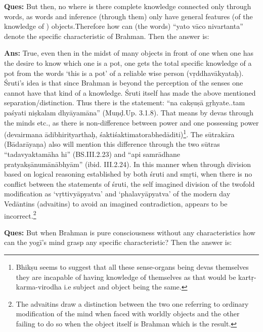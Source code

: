 
\textbf{Ques:}  But then, no where is there complete knowledge connected only through words, as words and inference (through them) only have general features (of the knowledge of ) objects.Therefore how can (the words) “yato vāco nivartanta” denote the specific characteristic of Brahman. Then the answer is: 

\textbf{Ans:} True, even then in the midst of many objects in front of one when one has the desire to know which one is a pot, one gets the total specific knowledge of a pot from the words ‘this is a pot’ of a reliable wise person (vṛddhavākyataḥ). Śruti’s idea is that since Brahman is beyond the perception of the senses one cannot have that kind of a knowledge. Śruti itself has made the above mentioned separation/distinction. Thus there is the statement:  “na cakṣuṣā gṛhyate..tam paśyati niṣkalam dhyāyamāna” (Muṇḍ.Up. 3.1.8). That means by devas through the minds etc., as there is non-difference between power and one possessing power (devairmana ādibhirityarthaḥ, śaktiśaktimatorabhedāditi)\footnote{Bhikṣu seems to suggest that all these sense-organs being devas themselves they are incapable of having knowledge of themselves as that would be kartṛ-karma-virodha i.e subject and object being the same.}. The sūtrakāra (Bādarāyaṇa) also will mention this difference through the two sūtras “tadavyaktamāha hi” (BS.III.2.23) and “api samrādhane pratyakṣānumānābhyām” (ibid. III.2.24). In this manner when through division based on logical reasoning established by both śruti and smṛti, when there is no conflict between the statements of śruti, the self imagined division of the twofold modification as ‘vṛttivyāpyatva’ and ‘phalavyāpyatva’ of the modern day Vedāntins (advaitins) to avoid an imagined contradiction, appears to be incorrect.\footnote{The advaitins draw a distinction between the two one referring to ordinary modification of the mind when faced with worldly objects and the other failing to do so when the object itself is Brahman which is the result.}

\textbf{Ques:}  But when Brahman is pure consciousness without any characteristics how can the yogī’s mind grasp any specific characteristic? Then the answer is: 

